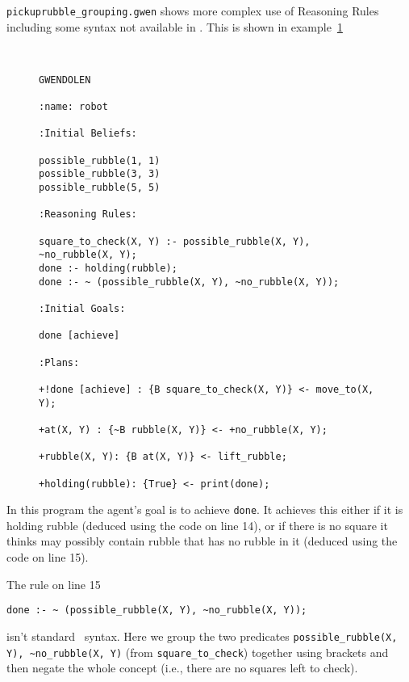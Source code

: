 \texttt{pickuprubble\_grouping.gwen} shows
more complex use of Reasoning Rules including
some syntax not available in \prolog.  This is shown in
example~\ref{code:pickuprubble_grouping} 
\begin{figure}[htb]
\begin{ourexample}
\label{code:pickuprubble_grouping} \quad \\
\begin{lstlisting}[basicstyle=\sffamily,style=easslisting,language=Gwendolen]
GWENDOLEN

:name: robot

:Initial Beliefs:

possible_rubble(1, 1)
possible_rubble(3, 3)
possible_rubble(5, 5)

:Reasoning Rules:

square_to_check(X, Y) :- possible_rubble(X, Y), ~no_rubble(X, Y);
done :- holding(rubble);
done :- ~ (possible_rubble(X, Y), ~no_rubble(X, Y));

:Initial Goals:

done [achieve]

:Plans:

+!done [achieve] : {B square_to_check(X, Y)} <- move_to(X, Y);

+at(X, Y) : {~B rubble(X, Y)} <- +no_rubble(X, Y);

+rubble(X, Y): {B at(X, Y)} <- lift_rubble;

+holding(rubble): {True} <- print(done);
\end{lstlisting}
\end{ourexample}
\end{figure}

In this program the agent's goal is to achieve \lstinline{done}.  It
achieves this either if it is holding rubble (deduced using the code
on line 14), or if there is no square it thinks may possibly contain
rubble that has no rubble in it (deduced using the code on line
15). 

\begin{sloppypar}
The rule on line 15
\begin{verbatim}
done :- ~ (possible_rubble(X, Y), ~no_rubble(X, Y));
\end{verbatim}
isn't standard \prolog\ syntax.  Here we group the two predicates
\lstinline{possible_rubble(X, Y), ~no_rubble(X, Y)} (from
\lstinline{square_to_check}) together using brackets and then negate
the whole concept (i.e., there are no squares left to
check). 
\end{sloppypar}

